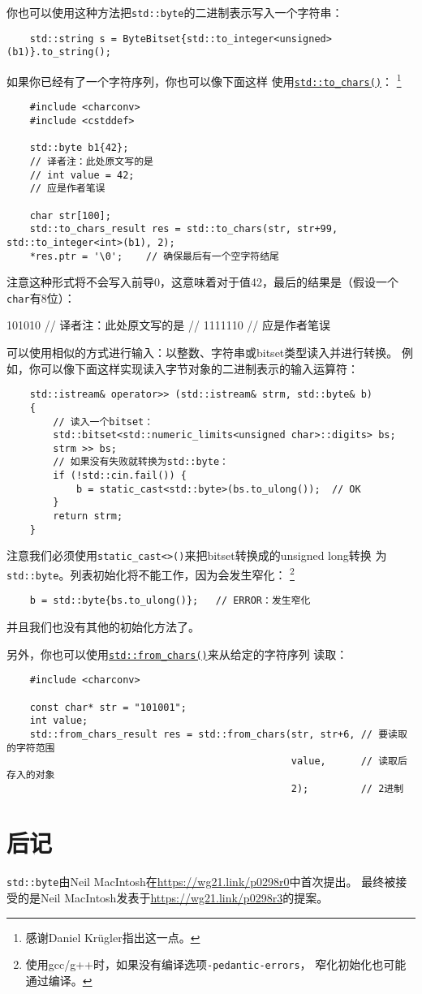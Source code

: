 你也可以使用这种方法把\texttt{std::byte}的二进制表示写入一个字符串：
\begin{lstlisting}
    std::string s = ByteBitset{std::to_integer<unsigned>(b1)}.to_string();
\end{lstlisting}
如果你已经有了一个字符序列，你也可以像下面这样
使用\hyperref[ch31.2.2]{\texttt{std::to\_chars()}}：\label{byte到位序列}
\footnote{感谢Daniel Krügler指出这一点。}
\begin{lstlisting}
    #include <charconv>
    #include <cstddef>

    std::byte b1{42};
    // 译者注：此处原文写的是
    // int value = 42;
    // 应是作者笔误

    char str[100];
    std::to_chars_result res = std::to_chars(str, str+99, std::to_integer<int>(b1), 2);
    *res.ptr = '\0';    // 确保最后有一个空字符结尾
\end{lstlisting}
注意这种形式将不会写入前导0，这意味着对于值42，最后的结果是（假设一个\texttt{char}有8位）：
\begin{blacklisting}
    101010
    // 译者注：此处原文写的是
    // 1111110
    // 应是作者笔误
\end{blacklisting}
可以使用相似的方式进行输入：以整数、字符串或bitset类型读入并进行转换。
例如，你可以像下面这样实现读入字节对象的二进制表示的输入运算符：
\begin{lstlisting}
    std::istream& operator>> (std::istream& strm, std::byte& b)
    {
        // 读入一个bitset：
        std::bitset<std::numeric_limits<unsigned char>::digits> bs;
        strm >> bs;
        // 如果没有失败就转换为std::byte：
        if (!std::cin.fail()) {
            b = static_cast<std::byte>(bs.to_ulong());  // OK
        }
        return strm;
    }
\end{lstlisting}
注意我们必须使用\texttt{static\_cast<>()}来把bitset转换成的unsigned long转换
为\texttt{std::byte}。列表初始化将不能工作，因为会发生窄化：
\footnote{使用gcc/g++时，如果没有编译选项\texttt{-pedantic-errors}，
窄化初始化也可能通过编译。}
\begin{lstlisting}
    b = std::byte{bs.to_ulong()};   // ERROR：发生窄化
\end{lstlisting}
并且我们也没有其他的初始化方法了。

另外，你也可以使用\hyperref[ch31.2.1]{\texttt{std::from\_chars()}}来从给定的字符序列
读取：\label{位序列到byte}
\begin{lstlisting}
    #include <charconv>

    const char* str = "101001";
    int value;
    std::from_chars_result res = std::from_chars(str, str+6, // 要读取的字符范围
                                                 value,      // 读取后存入的对象
                                                 2);         // 2进制
\end{lstlisting}


\section{后记}
\texttt{std::byte}由Neil MacIntosh在\url{https://wg21.link/p0298r0}中首次提出。
最终被接受的是Neil MacIntosh发表于\url{https://wg21.link/p0298r3}的提案。